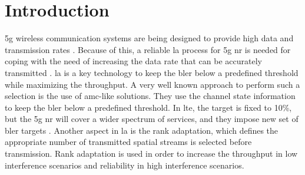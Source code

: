 \glsresetall
%
\chapter{Introduction} \label{chp:introduction}
\Gls{5g} wireless communication systems are being designed to provide high data and transmission rates \cite{Amin_2016}.
%
Because of this, a reliable \gls{la} process for \gls{5g} \gls{nr} is needed for coping with the need of increasing the data rate that can be accurately transmitted \cite{chu01}.
%
\Gls{la} is a key technology to keep the \gls{bler} below a predefined threshold while maximizing the throughput.
%
%
%
A very well known approach to perform such a selection is the use of \gls{amc}-like solutions.
%
They use the channel state information to keep the \gls{bler} below a predefined threshold.
%
In \gls{lte}, the target is fixed to 10\%, but the \gls{5g} \gls{nr} will cover a wider spectrum of services, and they impose new set of \gls{bler} targets \cite{Amin_2016,fantacci2009adaptive}.
%
Another aspect in \gls{la} is the rank adaptation, which defines the appropriate number of transmitted spatial streams is selected before transmission.
%
Rank adaptation is used in order to increase the throughput in low interference scenarios and reliability in high interference scenarios.

%
%

